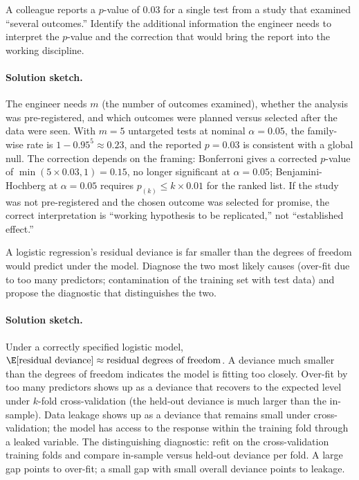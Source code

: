 \begin{exercise}
A colleague reports a $p$-value of $0.03$ for a single test from a
study that examined ``several outcomes.'' Identify the additional
information the engineer needs to interpret the $p$-value and the
correction that would bring the report into the working discipline.

\paragraph{Solution sketch.} The engineer needs $m$ (the number
of outcomes examined), whether the analysis was pre-registered,
and which outcomes were planned versus selected after the data
were seen. With $m = 5$ untargeted tests at nominal $\alpha =
0.05$, the family-wise rate is $1 - 0.95^{5} \approx 0.23$, and
the reported $p = 0.03$ is consistent with a global null. The
correction depends on the framing: Bonferroni gives a corrected
$p$-value of $\min(5 \times 0.03, 1) = 0.15$, no longer
significant at $\alpha = 0.05$; Benjamini-Hochberg at $\alpha =
0.05$ requires $p_{(k)} \leq k \times 0.01$ for the ranked
list. If the study was not pre-registered and the chosen
outcome was selected for promise, the correct interpretation is
``working hypothesis to be replicated,'' not ``established
effect.''
\end{exercise}

\begin{exercise}
A logistic regression's residual deviance is far smaller than the
degrees of freedom would predict under the model. Diagnose the
two most likely causes (over-fit due to too many predictors;
contamination of the training set with test data) and propose the
diagnostic that distinguishes the two.

\paragraph{Solution sketch.} Under a correctly specified
logistic model, $\E[\text{residual deviance}] \approx
\text{residual degrees of freedom}$. A deviance much smaller than
the degrees of freedom indicates the model is fitting too
closely. Over-fit by too many predictors shows up as a deviance
that recovers to the expected level under $k$-fold cross-validation
(the held-out deviance is much larger than the in-sample). Data
leakage shows up as a deviance that remains small under
cross-validation; the model has access to the response within the
training fold through a leaked variable. The distinguishing
diagnostic: refit on the cross-validation training folds and
compare in-sample versus held-out deviance per fold. A large gap
points to over-fit; a small gap with small overall deviance
points to leakage.
\end{exercise}

